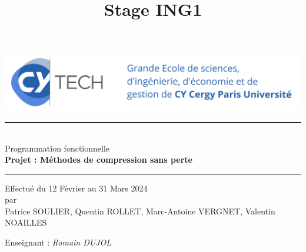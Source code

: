 

\RequirePackage{babel} %
\RequirePackage[utf8]{inputenc} %
\RequirePackage[section]{placeins}%
\RequirePackage[T1]{fontenc} %
\RequirePackage{float} %
\RequirePackage{graphicx} %
\RequirePackage[justification=centering]{caption} %
\RequirePackage{fancyhdr}
\setlength{\headheight}{32.80278pt}
\RequirePackage{url}
\RequirePackage[hidelinks]{hyperref}%
\RequirePackage[left=2.5cm,right=2.5cm,top=4cm,bottom=4cm]{geometry} %
\RequirePackage{tikz}
\RequirePackage{pdfpages} %


\chead{}
\rhead{}
\rfoot{}
\cfoot{\thepage}
\lfoot{}

\title{Stage ING1}



\begin{titlepage}
    \thispagestyle{empty}
    \begin{center}
        \includegraphics[scale=0.1]{assets/CY_Tech.png}

        \vfill

        \rule{\textwidth}{1pt}\\[0.5cm]
        {\Huge Programmation fonctionnelle}\\[0.5cm]
        {\Large \textbf{Projet : Méthodes de compression sans perte}}\\[0.5cm]
        \rule{\textwidth}{1pt}

        \vfill

        Effectué du 12 Février au 31 Mars 2024\\[0.5cm]

        par\\[0.5cm]

        Patrice SOULIER, Quentin ROLLET, Marc-Antoine VERGNET, Valentin NOAILLES\\[0.5cm]

        
        \vfill
    
        Enseignant : \textit{Romain DUJOL}
    \end{center}
\end{titlepage}

